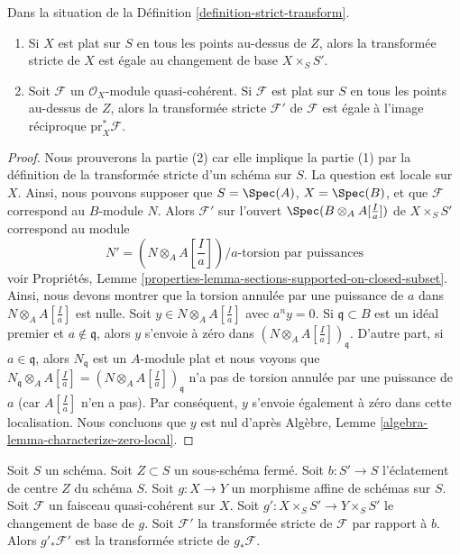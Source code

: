 \begin{lemma}
\label{lemma-strict-transform-flat}
Dans la situation de la Définition  \ref{definition-strict-transform}.
\begin{enumerate}
\item Si  $X$  est plat sur  $S$  en tous les points au-dessus de
 $Z$, alors la transformée stricte de  $X$  est égale au changement
de base  $X \times_S S'$.
\item Soit  $\mathcal{F}$  un  $\mathcal{O}_X$-module quasi-cohérent. Si  $\mathcal{F}$  est plat
sur  $S$  en tous les points au-dessus de  $Z$, alors la
transformée stricte  $\mathcal{F}'$  de  $\mathcal{F}$  est égale à l'image réciproque
 $\text{pr}_X^*\mathcal{F}$.
\end{enumerate}
\end{lemma}

\begin{proof}
Nous prouverons la partie (2) car elle implique la partie (1) par la définition de
la transformée stricte d'un schéma sur  $S$. La question est locale sur
 $X$. Ainsi, nous pouvons supposer que  $S = \Spec(A)$,  $X = \Spec(B)$, et que
 $\mathcal{F}$  correspond au  $B$-module  $N$. Alors  $\mathcal{F}'$ 
sur l'ouvert  $\Spec(B \otimes_A A[\frac{I}{a}])$  de  $X \times_S S'$  correspond au module
$$
N' = (N \otimes_A A[\textstyle{\frac{I}{a}}])/a\text{-torsion par puissances}
$$
voir Propriétés, Lemme  \ref{properties-lemma-sections-supported-on-closed-subset}. Ainsi, nous devons montrer que la
torsion annulée par une puissance de  $a$  dans  $N \otimes_A A[\frac{I}{a}]$  est nulle. Soit  $y \in N \otimes_A A[\frac{I}{a}]$  avec
 $a^n y = 0$. Si  $\mathfrak q \subset B$  est un idéal premier et  $a \not \in \mathfrak q$, alors
 $y$  s'envoie à zéro dans  $(N \otimes_A A[\frac{I}{a}])_\mathfrak q$. D'autre part, si  $a \in \mathfrak q$,
alors  $N_\mathfrak q$  est un  $A$-module plat et nous voyons que  $N_\mathfrak q \otimes_A A[\frac{I}{a}]
=(N \otimes_A A[\frac{I}{a}])_\mathfrak q$ 
n'a pas de torsion annulée par une puissance de  $a$ (car  $A[\frac{I}{a}]$  n'en a pas). Par
conséquent,  $y$  s'envoie également à zéro dans cette localisation. Nous
concluons que  $y$  est nul d'après Algèbre, Lemme  \ref{algebra-lemma-characterize-zero-local}.
\end{proof}

\begin{lemma}
\label{lemma-strict-transform-affine}
Soit  $S$  un schéma. Soit  $Z \subset S$  un sous-schéma fermé. Soit
 $b : S' \to S$  l'éclatement de centre  $Z$  du schéma  $S$. Soit  $g : X \to Y$  un
morphisme affine de schémas sur  $S$. Soit  $\mathcal{F}$  un faisceau
quasi-cohérent sur  $X$. Soit  $g' : X \times_S S' \to Y \times_S S'$  le changement de base de
 $g$. Soit  $\mathcal{F}'$  la transformée stricte de  $\mathcal{F}$  par rapport
à  $b$. Alors  $g'_*\mathcal{F}'$  est la transformée stricte de  $g_*\mathcal{F}$.
\end{lemma}

